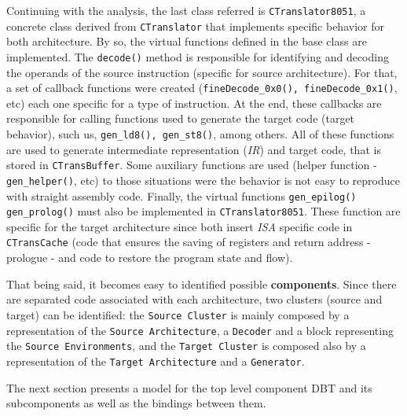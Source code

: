 Continuing with the analysis, the last class referred is \texttt{CTranslator8051}, a concrete class derived from \texttt{CTranslator} that implements specific behavior for both architecture. By so, the virtual functions defined in the base class are implemented. The \texttt{decode()} method is responsible for identifying and decoding the operands of the source instruction (specific for source architecture). For that, a set of callback functions were created (\texttt{fineDecode\_0x0(), fineDecode\_0x1()}, etc) each one specific for a type of instruction. At the end, these callbacks are responsible for calling functions used to generate the target code (target behavior), such us, \texttt{gen\_ld8(), gen\_st8()}, among others. All of these functions are used to generate intermediate representation (\textit{IR}) and target code, that is stored in \texttt{CTransBuffer}. Some auxiliary functions are used (helper function - \texttt{gen\_helper()}, etc) to those situations were the behavior is not easy to reproduce with straight assembly code.
Finally, the virtual functions \texttt{gen\_epilog()} \texttt{gen\_prolog()} must also be implemented in \texttt{CTranslator8051}. These function are specific for the target architecture since both insert \textit{ISA} specific code in \texttt{CTransCache} (code that ensures the saving of registers and return address - prologue - and code to restore the program state and flow).

That being said, it becomes easy to identified possible \textbf{components}. Since there are separated code associated with each architecture, two clusters (source and target) can be identified: the \texttt{Source Cluster} is mainly composed by a representation of the \texttt{Source Architecture}, a \texttt{Decoder} and a block representing the \texttt{Source Environments}, and the \texttt{Target Cluster} is composed also by a representation of the  \texttt{Target Architecture} and a  \texttt{Generator}.  

The next section presents a model for the top level component DBT and its subcomponents as well as the bindings between them. 
